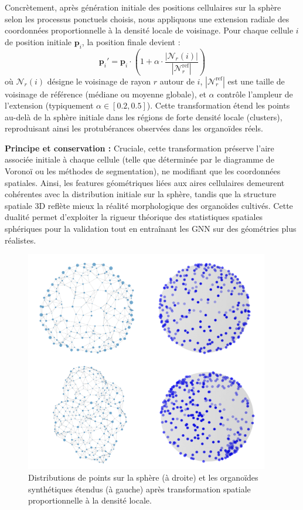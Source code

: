 Concrètement, après génération initiale des positions cellulaires sur la sphère selon les processus ponctuels choisis, nous appliquons une extension radiale des coordonnées proportionnelle à la densité locale de voisinage. Pour chaque cellule $i$ de position initiale $\mathbf{p}_i$, la position finale devient :
\[
\mathbf{p}_i' = \mathbf{p}_i \cdot \left(1 + \alpha \cdot \frac{|\mathcal{N}_r(i)|}{|\mathcal{N}_r^{\text{ref}}|}\right)
\]
où $\mathcal{N}_r(i)$ désigne le voisinage de rayon $r$ autour de $i$, $|\mathcal{N}_r^{\text{ref}}|$ est une taille de voisinage de référence (médiane ou moyenne globale), et $\alpha$ contrôle l'ampleur de l'extension (typiquement $\alpha \in [0.2, 0.5]$). Cette transformation étend les points au-delà de la sphère initiale dans les régions de forte densité locale (clusters), reproduisant ainsi les protubérances observées dans les organoïdes réels.

\textbf{Principe et conservation :}
Cruciale, cette transformation préserve l'aire associée initiale à chaque cellule (telle que déterminée par le diagramme de Voronoï ou les méthodes de segmentation), ne modifiant que les coordonnées spatiales. Ainsi, les features géométriques liées aux aires cellulaires demeurent cohérentes avec la distribution initiale sur la sphère, tandis que la structure spatiale 3D reflète mieux la réalité morphologique des organoïdes cultivés. Cette dualité permet d'exploiter la rigueur théorique des statistiques spatiales sphériques pour la validation tout en entraînant les GNN sur des géométries plus réalistes.

\begin{figure}[htbp]
    \centering
    \includegraphics[width=0.95\textwidth]{../img/Modelisation.png}
    \caption{Distributions de points sur la sphère (à droite) et les organoïdes synthétiques étendus (à gauche) après transformation spatiale proportionnelle à la densité locale.}
    \label{fig:modelisation}
\end{figure}


